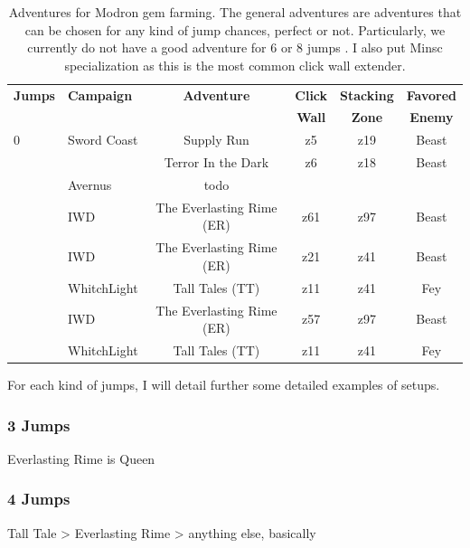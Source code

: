 \documentclass{article}
\begin{document}
\begin{table}[ht!]
\caption{Adventures for Modron \briv gem farming.
The general adventures are adventures that can be chosen for any kind of jump chances, perfect or not.
Particularly, we currently do not have a good adventure for 6 or 8 jumps \briv .
I also put Minsc specialization as this is the most common click wall extender.
}
\label{tbl:adventures}
\begin{small}
\begin{tabular}{ l | l c c c c }
\toprule
\textbf{Jumps} & \textbf{Campaign} & \textbf{Adventure} & \textbf{Click} & \textbf{Stacking} & \textbf{Favored}\\
&&&\textbf{Wall} & \textbf{Zone}& \textbf{Enemy}\\
\midrule
0       & Sword Coast  & Supply Run         & z5 & z19 & Beast \\
        &              & Terror In the Dark & z6 & z18 & Beast\\
        & Avernus      & todo & & &\\
\separatingLine
3       &  IWD & The Everlasting Rime (ER) & z61 & z97 & Beast\\
\separatingLine
4       &  IWD & The Everlasting Rime (ER) & z21 & z41 & Beast\\
        &  WhitchLight & Tall Tales (TT)   & z11 & z41 & Fey\\
\separatingLine
7       &  IWD & The Everlasting Rime (ER) & z57 & z97 & Beast \\
\separatingLine
9       & WhitchLight & Tall Tales (TT)    & z11 & z41 & Fey \\
\bottomrule
\end{tabular}
\end{small}
\end{table}

For each kind of jumps, I will detail further some detailed examples of setups.

\subsubsection{3 Jumps}

Everlasting Rime is Queen

\subsubsection{4 Jumps}

Tall Tale > Everlasting Rime > anything else, basically
\end{document}
